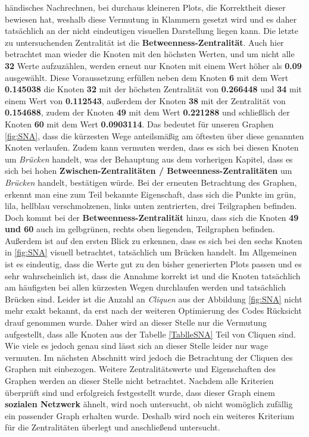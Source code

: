 händisches Nachrechnen, bei durchaus kleineren Plots, die Korrektheit dieser bewiesen hat, weshalb diese Vermutung in Klammern gesetzt wird und es daher tatsächlich an der nicht eindeutigen visuellen Darstellung liegen kann. Die letzte zu untersuchenden Zentralität ist die \textbf{Betweenness-Zentralität}. Auch hier betrachtet man wieder die Knoten mit den höchsten Werten, und um nicht alle \textbf{32} Werte aufzuzählen, werden erneut nur Knoten mit einem Wert höher als \textbf{0.09} ausgewählt. Diese Voraussetzung erfüllen neben dem Knoten \textbf{6} mit dem Wert \textbf{0.145038} die Knoten \textbf{32} mit der höchsten Zentralität von \textbf{0.266448} und \textbf{34} mit einem Wert von \textbf{0.112543}, außerdem der Knoten \textbf{38} mit der Zentralität von \textbf{0.154688}, zudem der Knoten \textbf{49} mit dem Wert \textbf{0.221288} und schließlich der Knoten \textbf{60} mit dem Wert \textbf{0.0903114}. Das bedeutet für unseren Graphen \ref{fig:SNA}, dass die kürzesten Wege anteilsmäßig am öftesten über diese genannten Knoten verlaufen. Zudem kann vermuten werden, dass es sich bei diesen Knoten um \textit{Brücken} handelt, was der Behauptung aus dem vorherigen Kapitel, dass es sich bei hohen \textbf{Zwischen-Zentralitäten / Betweenness-Zentralitäten} um \textit{Brücken} handelt, bestätigen würde. Bei der erneuten Betrachtung des Graphen, erkennt man eine zum Teil bekannte Eigenschaft, dass sich die Punkte im grün, lila, hellblau verschmolzenen, links unten zentrierten, drei Teilgraphen befinden. Doch kommt bei der \textbf{Betweenness-Zentralität} hinzu, dass sich die Knoten \textbf{49 und 60} auch im gelbgrünen, rechts oben liegenden, Teilgraphen befinden. Außerdem ist auf den ersten Blick zu erkennen, dass es sich bei den sechs Knoten in \ref{fig:SNA} visuell betrachtet, tatsächlich um Brücken handelt. Im Allgemeinen ist es eindeutig, dass die Werte gut zu den bisher generierten Plots passen und es sehr wahrscheinlich ist, dass die Annahme korrekt ist und die Knoten tatsächlich am häufigsten bei allen kürzesten Wegen durchlaufen werden und tatsächlich Brücken sind. Leider ist die Anzahl an \textit{Cliquen} aus der Abbildung \ref{fig:SNA} nicht mehr exakt bekannt, da erst nach der weiteren Optimierung des Codes Rücksicht drauf genommen wurde. Daher wird an dieser Stelle nur die Vermutung aufgestellt, dass alle Knoten aus der Tabelle \ref{TablleSNA} Teil von Cliquen sind. Wie viele es jedoch genau sind lässt sich an dieser Stelle leider nur wage vermuten. Im nächsten Abschnitt wird jedoch die Betrachtung der Cliquen des Graphen mit einbezogen. Weitere Zentralitätswerte und Eigenschaften des Graphen werden an dieser Stelle nicht betrachtet. Nachdem alle Kriterien überprüft sind und erfolgreich festgestellt wurde, dass dieser Graph einem \textbf{sozialen Netzwerk} ähnelt, wird noch untersucht, ob nicht womöglich zufällig ein passender Graph erhalten wurde. Deshalb wird noch ein weiteres Kriterium für die Zentralitäten überlegt und anschließend untersucht.


